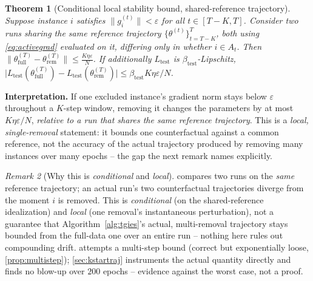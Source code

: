 \documentclass{article}
\theoremstyle{plain}
\newtheorem{theorem}{Theorem}[section]
\theoremstyle{definition}
\theoremstyle{remark}
\newtheorem{remark}[theorem]{Remark}
\begin{document}
\begin{theorem}[Conditional local stability bound, shared-reference trajectory]
\label{thm:safe}
Suppose instance $i$ satisfies $\|g_i^{(t)}\| < \varepsilon$ for all $t\in[T-K,T]$. Consider two runs sharing the same reference trajectory $\{\theta^{(t)}\}_{t=T-K}^T$, both using \cref{eq:activegrad} evaluated on it, differing only in whether $i \in A_t$. Then $\big\|\theta^{(T)}_{\mathrm{full}} - \theta^{(T)}_{\mathrm{rem}}\big\| \le \frac{K\eta\varepsilon}{N}$. If additionally $L_{\mathrm{test}}$ is $\beta_{\mathrm{test}}$-Lipschitz, $\big|L_{\mathrm{test}}(\theta^{(T)}_{\mathrm{full}}) - L_{\mathrm{test}}(\theta^{(T)}_{\mathrm{rem}})\big| \le \beta_{\mathrm{test}} K\eta\varepsilon/N$.
\end{theorem}
\textbf{Interpretation.} If one excluded instance's gradient norm stays below $\varepsilon$ throughout a $K$-step window, removing it changes the parameters by at most $K\eta\varepsilon/N$, \emph{relative to a run that shares the same reference trajectory}. This is a \emph{local, single-removal} statement: it bounds one counterfactual against a common reference, not the accuracy of the actual trajectory produced by removing many instances over many epochs -- the gap the next remark names explicitly.
\begin{remark}[Why this is \emph{conditional} and \emph{local}]
\label{rem:shared-traj}
 compares two runs on the \emph{same} reference trajectory; an actual run's two counterfactual trajectories diverge from the moment $i$ is removed. This is \emph{conditional} (on the shared-reference idealization) and \emph{local} (one removal's instantaneous perturbation), not a guarantee that Algorithm~\ref{alg:tgies}'s actual, multi-removal trajectory stays bounded from the full-data one over an entire run -- nothing here rules out compounding drift.  attempts a multi-step bound (correct but exponentially loose, \cref{prop:multistep}); \cref{sec:kstartraj} instruments the actual quantity directly and finds no blow-up over $200$ epochs -- evidence against the worst case, not a proof.
\end{remark}
\end{document}
